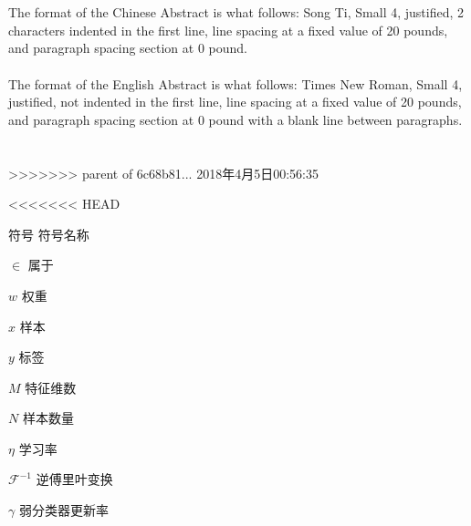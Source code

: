 \begin{englishabstract}
\\~\\
The format of the Chinese Abstract is what follows: Song Ti, Small 4, justified, 2 characters indented in the first line, line spacing at a fixed value of 20 pounds, and paragraph spacing section at 0 pound.
\\~\\
The format of the English Abstract is what follows: Times New Roman, Small 4, justified, not indented in the first line, line spacing at a fixed value of 20 pounds, and paragraph spacing section at 0 pound with a blank line between paragraphs.
~\\
 \\
>>>>>>> parent of 6c68b81... 2018年4月5日00:56:35

\end{englishabstract}


<<<<<<< HEAD

\XDUpremainmatter

\begin{symbollist}
\item [符号] \hspace{12em} {符号名称}
\item [$\in$]\hspace{12.5em} {属于}
\item [$w$] \hspace{12.5em} {权重}
\item [$x$] \hspace{12.5em} {样本}
\item [$y$] \hspace{12.5em} {标签}
\item [$M$] \hspace{12.5em} {特征维数}
\item [$N$] \hspace{12.5em} {样本数量}
\item [$\eta$] \hspace{12.5em} {学习率}
\item [$\mathcal{F}^{-1}$] \hspace{12.5em} {逆傅里叶变换}
\item [$\gamma$] \hspace{12.5em} {弱分类器更新率}
\end{symbollist}

